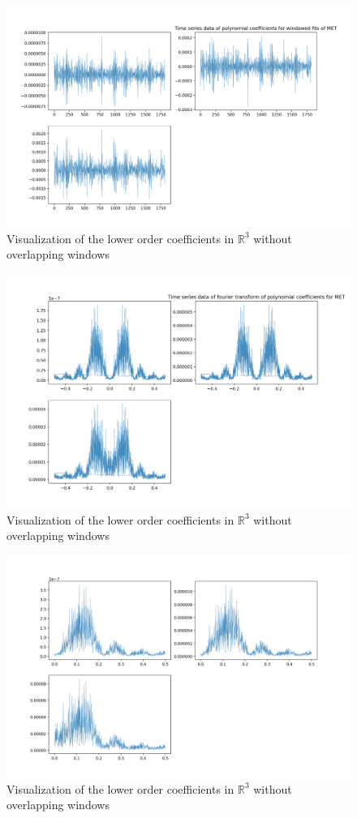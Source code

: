 \documentclass[final]{article}
\begin{document}
\begin{figure}[H]
  \centering
  \includegraphics[width=\linewidth]{img/fourier1}
  \caption{Visualization of the lower order coefficients in $\mathbb{R}^3$
  without overlapping windows}
  \label{fig:coeff}
\end{figure}

\begin{figure}[H]
  \centering
  \includegraphics[width=\linewidth]{img/fourier2}
  \caption{Visualization of the lower order coefficients in $\mathbb{R}^3$
  without overlapping windows}
  \label{fig:coeff}
\end{figure}

\begin{figure}[H]
  \centering
  \includegraphics[width=\linewidth]{img/fourier3}
  \caption{Visualization of the lower order coefficients in $\mathbb{R}^3$
  without overlapping windows}
  \label{fig:coeff}
\end{figure}
\end{document}
